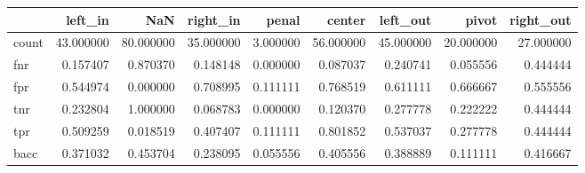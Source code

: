 \begin{tabular}{lrrrrrrrr}
\toprule
{} &    left\_in &        NaN &   right\_in &     penal &     center &   left\_out &      pivot &  right\_out \\
\midrule
count &  43.000000 &  80.000000 &  35.000000 &  3.000000 &  56.000000 &  45.000000 &  20.000000 &  27.000000 \\
fnr   &   0.157407 &   0.870370 &   0.148148 &  0.000000 &   0.087037 &   0.240741 &   0.055556 &   0.444444 \\
fpr   &   0.544974 &   0.000000 &   0.708995 &  0.111111 &   0.768519 &   0.611111 &   0.666667 &   0.555556 \\
tnr   &   0.232804 &   1.000000 &   0.068783 &  0.000000 &   0.120370 &   0.277778 &   0.222222 &   0.444444 \\
tpr   &   0.509259 &   0.018519 &   0.407407 &  0.111111 &   0.801852 &   0.537037 &   0.277778 &   0.444444 \\
bacc  &   0.371032 &   0.453704 &   0.238095 &  0.055556 &   0.405556 &   0.388889 &   0.111111 &   0.416667 \\
\bottomrule
\end{tabular}
